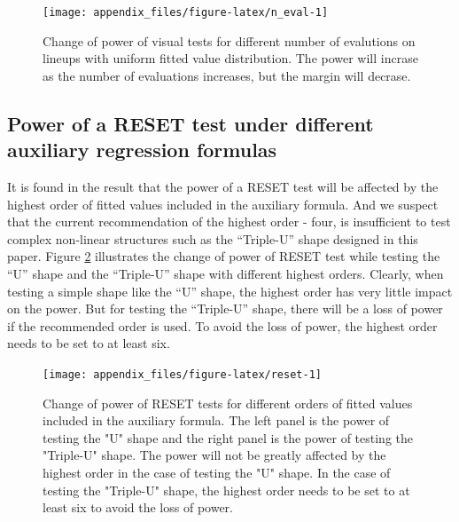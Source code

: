 \documentclass[]{interact}
\theoremstyle{plain}%
\theoremstyle{definition}
\theoremstyle{remark}
\begin{document}
\begin{figure}

{\centering \texttt{[image: appendix\_files/figure-latex/n\_eval-1]} 

}

\caption{Change of power of visual tests for different number of evalutions on lineups with uniform fitted value distribution. The power will incrase as the number of evaluations increases, but the margin will decrase.}\label{fig:n_eval}
\end{figure}

\hypertarget{power-of-a-reset-test-under-different-auxiliary-regression-formulas}{%
\subsection{Power of a RESET test under different auxiliary regression
formulas}\label{power-of-a-reset-test-under-different-auxiliary-regression-formulas}}

It is found in the result that the power of a RESET test will be
affected by the highest order of fitted values included in the auxiliary
formula. And we suspect that the current recommendation of the highest
order - four, is insufficient to test complex non-linear structures such
as the ``Triple-U'' shape designed in this paper. Figure \ref{fig:reset}
illustrates the change of power of RESET test while testing the ``U''
shape and the ``Triple-U'' shape with different highest orders. Clearly,
when testing a simple shape like the ``U'' shape, the highest order has
very little impact on the power. But for testing the ``Triple-U'' shape,
there will be a loss of power if the recommended order is used. To avoid
the loss of power, the highest order needs to be set to at least six.

\begin{figure}

{\centering \texttt{[image: appendix\_files/figure-latex/reset-1]} 

}

\caption{Change of power of RESET tests for different orders of fitted values included in the auxiliary formula. The left panel is the power of testing the "U" shape and the right panel is the power of testing the "Triple-U" shape. The power will not be greatly affected by the highest order in the case of testing the "U" shape. In the case of testing the "Triple-U" shape, the highest order needs to be set to at least six to avoid the loss of power.}\label{fig:reset}
\end{figure}
\end{document}
